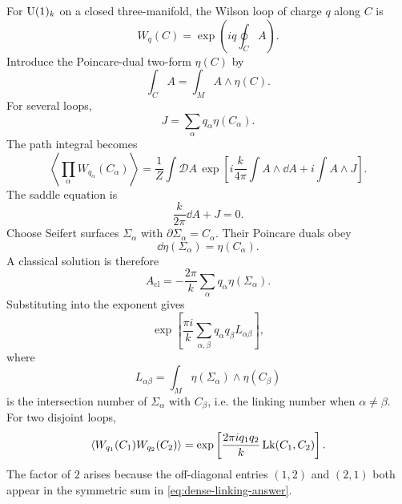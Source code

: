 For $\operatorname{U}(1)_k$ on a closed three-manifold, the Wilson loop of charge $q$ along $C$ is
\begin{equation}
  W_q(C)=\exp\left(iq\oint_C A\right).
  \label{eq:dense-abelian-wilson}
\end{equation}
Introduce the Poincare-dual two-form $\eta(C)$ by
\begin{equation}
  \int_C A=\int_M A\wedge\eta(C).
  \label{eq:dense-poincare-dual-loop}
\end{equation}
For several loops,
\begin{equation}
  J=\sum_\alpha q_\alpha \eta(C_\alpha).
  \label{eq:dense-source-J}
\end{equation}
The path integral becomes
\begin{equation}
  \left\langle\prod_\alpha W_{q_\alpha}(C_\alpha)\right\rangle
  =
  \frac{1}{Z}
  \int\mathcal DA\,
  \exp\left[
  i\frac{k}{4\pi}\int A\wedge\dd A
  +
  i\int A\wedge J
  \right].
  \label{eq:dense-gaussian-wilson}
\end{equation}
The saddle equation is
\begin{equation}
  \frac{k}{2\pi}\dd A+J=0.
  \label{eq:dense-gaussian-eom}
\end{equation}
Choose Seifert surfaces $\Sigma_\alpha$ with $\partial\Sigma_\alpha=C_\alpha$. Their Poincare duals obey
\begin{equation}
  \dd\eta(\Sigma_\alpha)=\eta(C_\alpha).
  \label{eq:dense-seifert-dual}
\end{equation}
A classical solution is therefore
\begin{equation}
  A_{\mathrm{cl}}
  =
  -\frac{2\pi}{k}
  \sum_\alpha q_\alpha\eta(\Sigma_\alpha).
  \label{eq:dense-A-classical}
\end{equation}
Substituting into the exponent gives
\begin{equation}
  \exp\left[
  \frac{\pi i}{k}
  \sum_{\alpha,\beta}
  q_\alpha q_\beta
  L_{\alpha\beta}
  \right],
  \label{eq:dense-linking-answer}
\end{equation}
where
\begin{equation}
  L_{\alpha\beta}
  =
  \int_M\eta(\Sigma_\alpha)\wedge\eta(C_\beta)
  \label{eq:dense-linking-intersection}
\end{equation}
is the intersection number of $\Sigma_\alpha$ with $C_\beta$, i.e. the linking number when $\alpha\neq\beta$. For two disjoint loops,
\begin{equation}
  \langle W_{q_1}(C_1)W_{q_2}(C_2)\rangle
  =
  \exp\left[
  \frac{2\pi iq_1q_2}{k}\operatorname{Lk}(C_1,C_2)
  \right].
  \label{eq:dense-two-loop-linking}
\end{equation}
The factor of $2$ arises because the off-diagonal entries $(1,2)$ and $(2,1)$ both appear in the symmetric sum in \eqref{eq:dense-linking-answer}.

